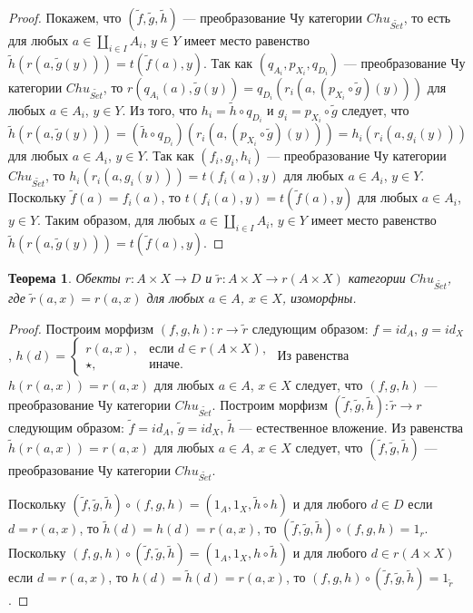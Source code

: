 \documentclass[a4paper,12pt]{article}
\newtheorem{theorem}{Теорема}
\begin{document}
\begin{proof}
    Покажем, что $(\tilde{f},\tilde{g},\tilde{h})$ --- преобразование Чу категории $Chu_{\widetilde{Set}}$, то есть для любых $a \in \coprod_{i \in I} A_i$, $y \in Y$ имеет место равенство $\tilde{h}(r(a,\tilde{g}(y))) = t(\tilde{f}(a),y)$. Так как $(q_{A_i},p_{X_i},q_{D_i})$ --- преобразование Чу категории $Chu_{\widetilde{Set}}$, то $r(q_{A_i}(a),\tilde{g}(y)) = q_{D_i}(r_i(a,(p_{X_i} \circ \tilde{g})(y)))$ для любых $a \in A_i$, $y \in Y$. Из того, что $h_i = \tilde{h} \circ q_{D_i}$ и $g_i = p_{X_i} \circ \tilde{g}$ следует, что $\tilde{h}(r(a,\tilde{g}(y))) = (\tilde{h} \circ q_{D_i})(r_i(a,(p_{X_i} \circ \tilde{g})(y))) = h_i(r_i(a,g_i(y)))$ для любых $a \in A_i$, $y \in Y$. Так как $(f_i,g_i,h_i)$ --- преобразование Чу категории $Chu_{\widetilde{Set}}$, то $h_i(r_i(a,g_i(y))) = t(f_i(a),y)$ для любых $a \in A_i$, $y \in Y$. Поскольку $\tilde{f}(a) = f_i(a)$, то $t(f_i(a),y) = t(\tilde{f}(a),y)$ для любых $a \in A_i$, $y \in Y$. Таким образом, для любых $a \in \coprod_{i \in I} A_i$, $y \in Y$ имеет место равенство $\tilde{h}(r(a,\tilde{g}(y))) = t(\tilde{f}(a),y)$.
\end{proof}

\begin{theorem}\label{iso}
    Обекты $r: A \times X \to D$ и $\tilde{r}: A \times X \to r(A \times X)$ категории $Chu_{\widetilde{Set}}$, где $\tilde{r}(a,x) = r(a,x)$ для любых $a \in A$, $x \in X$, изоморфны.
\end{theorem}
\begin{proof}
    Построим морфизм $(f,g,h): r \to \tilde{r}$ следующим образом: $f = id_A$, $g = id_X$, $h(d) = 
    \begin{cases}
        r(a,x),& \text{если } d \in r(A \times X),\\
        \star,& \text{иначе}.
    \end{cases}$
    Из равенства $h(r(a,x)) = r(a,x)$ для любых $a \in A$, $x \in X$ следует, что $(f,g,h)$ --- преобразование Чу категории $Chu_{\widetilde{Set}}$. Построим морфизм $(\tilde{f},\tilde{g},\tilde{h}): \tilde{r} \to r$ следующим образом: $\tilde{f} = id_A$, $\tilde{g} = id_X$, $\tilde{h}$ --- естественное вложение. Из равенства $\tilde{h}(r(a,x)) = r(a,x)$ для любых $a \in A$, $x \in X$ следует, что $(\tilde{f},\tilde{g},\tilde{h})$ --- преобразование Чу категории $Chu_{\widetilde{Set}}$.

    Поскольку $(\tilde{f},\tilde{g},\tilde{h}) \circ (f,g,h) = (1_A,1_X,\tilde{h} \circ h)$ и для любого $d \in D$ если $d = r(a,x)$, то $\tilde{h}(d) = h(d) = r(a,x)$, то $(\tilde{f},\tilde{g},\tilde{h}) \circ (f,g,h) = 1_r$. Поскольку $(f,g,h) \circ (\tilde{f},\tilde{g},\tilde{h}) = (1_A,1_X,h \circ \tilde{h})$ и для любого $d \in r(A \times X)$ если $d = r(a,x)$, то $h(d) = \tilde{h}(d) = r(a,x)$, то $(f,g,h) \circ (\tilde{f},\tilde{g},\tilde{h}) = 1_{\tilde{r}}$.
\end{proof}
\end{document}

